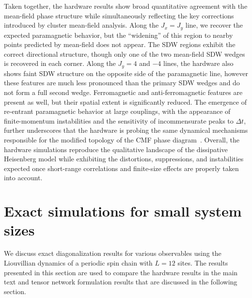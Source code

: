 \documentclass[aps,prb,twocolumn,superscriptaddress,longbibliography]{revtex4-2}
\begin{document}
Taken together, the hardware results show broad quantitative agreement with the mean-field phase structure while simultaneously reflecting the key corrections introduced by cluster mean-field analysis. Along the $J_x = J_y$ line, we recover the expected paramagnetic behavior, but the ``widening'' of this region to nearby points predicted by mean-field does not appear. The SDW regions exhibit the correct directional structure, though only one of the two mean-field SDW wedges is recovered in each corner. Along the $J_y = 4$ and $-4$ lines, the hardware also shows faint SDW structure on the opposite side of the paramagnetic line, however these features are much less pronounced than the primary SDW wedges and do not form a full second wedge. Ferromagnetic and anti-ferromagnetic features are present as well, but their spatial extent is significantly reduced. The emergence of re-entrant paramagnetic behavior at large couplings, with the appearance of finite-momentum instabilities and the sensitivity of incommensurate peaks to $\Delta t$, further underscores that the hardware is probing the same dynamical mechanisms responsible for the modified topology of the CMF phase diagram~. Overall, the hardware simulations reproduce the qualitative landscape of the dissipative Heisenberg model while exhibiting the distortions, suppressions, and instabilities expected once short-range correlations and finite-size effects are properly taken into account.

\section{Exact simulations for small system sizes}
\label{app:exact}

We discuss exact diagonalization results for various observables using the Liouvillian dynamics of a periodic spin chain with $L=12$ sites. The results presented in this section are used to compare the hardware results in the main text and tensor network formulation results that are discussed in the following section.
\end{document}

